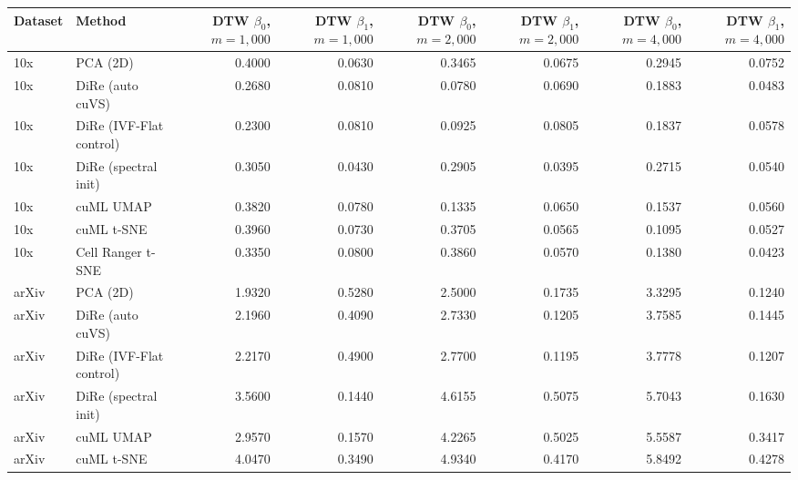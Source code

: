 \begin{tabular}{@{}llrrrrrr@{}}
\toprule
Dataset & Method & DTW $\beta_0$, $m=1,000$ & DTW $\beta_1$, $m=1,000$ & DTW $\beta_0$, $m=2,000$ & DTW $\beta_1$, $m=2,000$ & DTW $\beta_0$, $m=4,000$ & DTW $\beta_1$, $m=4,000$ \\
\midrule
10x & PCA (2D) & 0.4000 & 0.0630 & 0.3465 & 0.0675 & 0.2945 & 0.0752 \\
10x & DiRe (auto cuVS) & 0.2680 & 0.0810 & 0.0780 & 0.0690 & 0.1883 & 0.0483 \\
10x & DiRe (IVF-Flat control) & 0.2300 & 0.0810 & 0.0925 & 0.0805 & 0.1837 & 0.0578 \\
10x & DiRe (spectral init) & 0.3050 & 0.0430 & 0.2905 & 0.0395 & 0.2715 & 0.0540 \\
10x & cuML UMAP & 0.3820 & 0.0780 & 0.1335 & 0.0650 & 0.1537 & 0.0560 \\
10x & cuML t-SNE & 0.3960 & 0.0730 & 0.3705 & 0.0565 & 0.1095 & 0.0527 \\
10x & Cell Ranger t-SNE & 0.3350 & 0.0800 & 0.3860 & 0.0570 & 0.1380 & 0.0423 \\
\addlinespace
arXiv & PCA (2D) & 1.9320 & 0.5280 & 2.5000 & 0.1735 & 3.3295 & 0.1240 \\
arXiv & DiRe (auto cuVS) & 2.1960 & 0.4090 & 2.7330 & 0.1205 & 3.7585 & 0.1445 \\
arXiv & DiRe (IVF-Flat control) & 2.2170 & 0.4900 & 2.7700 & 0.1195 & 3.7778 & 0.1207 \\
arXiv & DiRe (spectral init) & 3.5600 & 0.1440 & 4.6155 & 0.5075 & 5.7043 & 0.1630 \\
arXiv & cuML UMAP & 2.9570 & 0.1570 & 4.2265 & 0.5025 & 5.5587 & 0.3417 \\
arXiv & cuML t-SNE & 4.0470 & 0.3490 & 4.9340 & 0.4170 & 5.8492 & 0.4278 \\
\bottomrule
\end{tabular}
